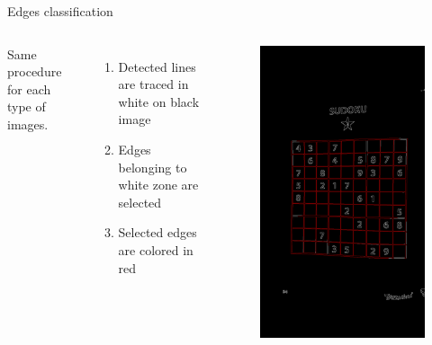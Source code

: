\documentclass[12pt]{beamer}
\begin{document}
\begin{frame}{Edges classification}
    \begin{columns}
    Same procedure for each type of images.
    \begin{enumerate}
        \item Detected lines are traced in white on black image
        \item Edges belonging to white zone are selected
        \item Selected edges are colored in red
    \end{enumerate}
    \begin{figure}
        \includegraphics[width=\textwidth]{resources/png/sudoku_00018_03.png}
    \end{figure}
    \end{columns}
\end{frame}
\end{document}
